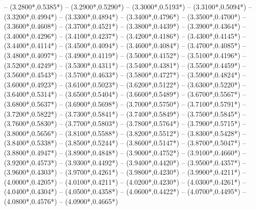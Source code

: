 {	-- ({3.2800*\dx},{0.5385*\dy})
	-- ({3.2900*\dx},{0.5290*\dy})
	-- ({3.3000*\dx},{0.5193*\dy})
	-- ({3.3100*\dx},{0.5094*\dy})
	-- ({3.3200*\dx},{0.4994*\dy})
	-- ({3.3300*\dx},{0.4894*\dy})
	-- ({3.3400*\dx},{0.4796*\dy})
	-- ({3.3500*\dx},{0.4700*\dy})
	-- ({3.3600*\dx},{0.4608*\dy})
	-- ({3.3700*\dx},{0.4521*\dy})
	-- ({3.3800*\dx},{0.4439*\dy})
	-- ({3.3900*\dx},{0.4364*\dy})
	-- ({3.4000*\dx},{0.4296*\dy})
	-- ({3.4100*\dx},{0.4237*\dy})
	-- ({3.4200*\dx},{0.4186*\dy})
	-- ({3.4300*\dx},{0.4145*\dy})
	-- ({3.4400*\dx},{0.4114*\dy})
	-- ({3.4500*\dx},{0.4094*\dy})
	-- ({3.4600*\dx},{0.4084*\dy})
	-- ({3.4700*\dx},{0.4085*\dy})
	-- ({3.4800*\dx},{0.4097*\dy})
	-- ({3.4900*\dx},{0.4119*\dy})
	-- ({3.5000*\dx},{0.4152*\dy})
	-- ({3.5100*\dx},{0.4196*\dy})
	-- ({3.5200*\dx},{0.4249*\dy})
	-- ({3.5300*\dx},{0.4311*\dy})
	-- ({3.5400*\dx},{0.4381*\dy})
	-- ({3.5500*\dx},{0.4459*\dy})
	-- ({3.5600*\dx},{0.4543*\dy})
	-- ({3.5700*\dx},{0.4633*\dy})
	-- ({3.5800*\dx},{0.4727*\dy})
	-- ({3.5900*\dx},{0.4824*\dy})
	-- ({3.6000*\dx},{0.4923*\dy})
	-- ({3.6100*\dx},{0.5023*\dy})
	-- ({3.6200*\dx},{0.5122*\dy})
	-- ({3.6300*\dx},{0.5220*\dy})
	-- ({3.6400*\dx},{0.5314*\dy})
	-- ({3.6500*\dx},{0.5404*\dy})
	-- ({3.6600*\dx},{0.5489*\dy})
	-- ({3.6700*\dx},{0.5567*\dy})
	-- ({3.6800*\dx},{0.5637*\dy})
	-- ({3.6900*\dx},{0.5698*\dy})
	-- ({3.7000*\dx},{0.5750*\dy})
	-- ({3.7100*\dx},{0.5791*\dy})
	-- ({3.7200*\dx},{0.5822*\dy})
	-- ({3.7300*\dx},{0.5841*\dy})
	-- ({3.7400*\dx},{0.5849*\dy})
	-- ({3.7500*\dx},{0.5845*\dy})
	-- ({3.7600*\dx},{0.5830*\dy})
	-- ({3.7700*\dx},{0.5803*\dy})
	-- ({3.7800*\dx},{0.5764*\dy})
	-- ({3.7900*\dx},{0.5715*\dy})
	-- ({3.8000*\dx},{0.5656*\dy})
	-- ({3.8100*\dx},{0.5588*\dy})
	-- ({3.8200*\dx},{0.5512*\dy})
	-- ({3.8300*\dx},{0.5428*\dy})
	-- ({3.8400*\dx},{0.5338*\dy})
	-- ({3.8500*\dx},{0.5244*\dy})
	-- ({3.8600*\dx},{0.5147*\dy})
	-- ({3.8700*\dx},{0.5047*\dy})
	-- ({3.8800*\dx},{0.4947*\dy})
	-- ({3.8900*\dx},{0.4848*\dy})
	-- ({3.9000*\dx},{0.4752*\dy})
	-- ({3.9100*\dx},{0.4660*\dy})
	-- ({3.9200*\dx},{0.4573*\dy})
	-- ({3.9300*\dx},{0.4492*\dy})
	-- ({3.9400*\dx},{0.4420*\dy})
	-- ({3.9500*\dx},{0.4357*\dy})
	-- ({3.9600*\dx},{0.4303*\dy})
	-- ({3.9700*\dx},{0.4261*\dy})
	-- ({3.9800*\dx},{0.4230*\dy})
	-- ({3.9900*\dx},{0.4211*\dy})
	-- ({4.0000*\dx},{0.4205*\dy})
	-- ({4.0100*\dx},{0.4211*\dy})
	-- ({4.0200*\dx},{0.4230*\dy})
	-- ({4.0300*\dx},{0.4261*\dy})
	-- ({4.0400*\dx},{0.4304*\dy})
	-- ({4.0500*\dx},{0.4358*\dy})
	-- ({4.0600*\dx},{0.4422*\dy})
	-- ({4.0700*\dx},{0.4495*\dy})
	-- ({4.0800*\dx},{0.4576*\dy})
	-- ({4.0900*\dx},{0.4665*\dy})
}
